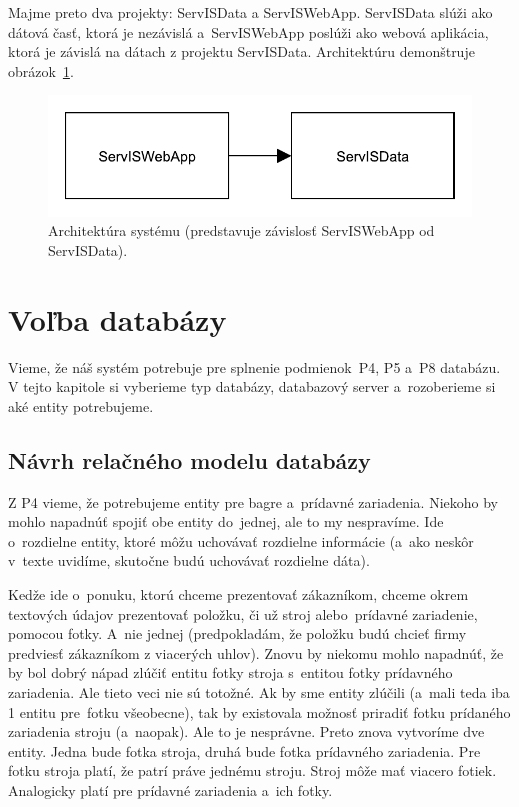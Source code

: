 Majme preto dva projekty: ServISData a ServISWebApp. ServISData slúži ako dátová časť, ktorá je nezávislá a~ServISWebApp poslúži ako webová aplikácia, ktorá je závislá na dátach z projektu ServISData. Architektúru demonštruje obrázok~\ref{architektura systemu}.

\begin{figure}[H]\centering
\includegraphics[width=140mm]{../img/architektura systemu}
\caption{Architektúra systému (predstavuje závislosť ServISWebApp od ServISData).}
\label{architektura systemu}
\end{figure}

\section{Voľba databázy}

Vieme, že náš systém potrebuje pre splnenie podmienok~P4, P5 a~P8 databázu. V tejto kapitole si vyberieme typ databázy, databazový server a~rozoberieme si aké entity potrebujeme.

\subsection{Návrh relačného modelu databázy}
\label{navrh relacneho modelu databazy}

Z P4 vieme, že potrebujeme entity pre bagre a~prídavné zariadenia. Niekoho by mohlo napadnúť spojiť obe entity do~jednej, ale to my nespravíme. Ide o~rozdielne entity, ktoré môžu uchovávať rozdielne informácie (a~ako neskôr v~texte uvidíme, skutočne budú uchovávať rozdielne dáta).

Kedže ide o~ponuku, ktorú chceme prezentovať zákazníkom, chceme okrem textových údajov prezentovať položku, či už stroj alebo~prídavné zariadenie, pomocou fotky. A~nie jednej (predpokladám, že položku budú chcieť firmy predviesť zákazníkom z viacerých uhlov). Znovu by niekomu mohlo napadnúť, že by bol dobrý nápad zlúčiť entitu fotky stroja s~entitou fotky prídavného zariadenia. Ale tieto veci nie sú totožné. Ak by sme entity zlúčili (a~mali teda iba 1 entitu pre~fotku všeobecne), tak by existovala možnosť priradiť fotku prídaného zariadenia stroju (a~naopak). Ale to je nesprávne. Preto znova vytvoríme dve entity. Jedna bude fotka stroja, druhá bude fotka prídavného zariadenia. Pre fotku stroja platí, že patrí práve jednému stroju. Stroj môže mať viacero fotiek. Analogicky platí pre prídavné zariadenia a~ich fotky.

